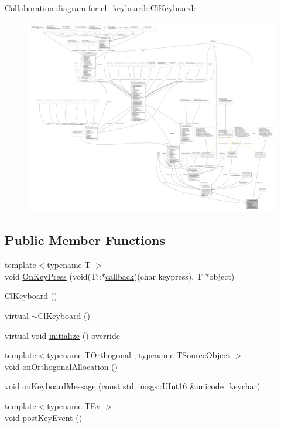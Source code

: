 Collaboration diagram for cl\+\_\+keyboard\+:\+:Cl\+Keyboard\+:
\nopagebreak
\begin{figure}[H]
\begin{center}
\leavevmode
\includegraphics[width=350pt]{classcl__keyboard_1_1ClKeyboard__coll__graph}
\end{center}
\end{figure}
\subsection*{Public Member Functions}
\begin{DoxyCompactItemize}
\item 
{\footnotesize template$<$typename T $>$ }\\void \hyperlink{classcl__keyboard_1_1ClKeyboard_ae9f4a6dc1ce18397394a432826970baa}{On\+Key\+Press} (void(T\+::$\ast$\hyperlink{sm__ridgeback__barrel__search__2_2servers_2opencv__perception__node_2opencv__perception__node_8cpp_a050e697bd654facce10ea3f6549669b3}{callback})(char keypress), T $\ast$object)
\item 
\hyperlink{classcl__keyboard_1_1ClKeyboard_aadf021c18ad32c50bd8b02f62293a47e}{Cl\+Keyboard} ()
\item 
virtual \hyperlink{classcl__keyboard_1_1ClKeyboard_af2f4ffb66639acb158d57d627a56d8e8}{$\sim$\+Cl\+Keyboard} ()
\item 
virtual void \hyperlink{classcl__keyboard_1_1ClKeyboard_af7f7fd9871ef5fcca400cd59d7b60775}{initialize} () override
\item 
{\footnotesize template$<$typename T\+Orthogonal , typename T\+Source\+Object $>$ }\\void \hyperlink{classcl__keyboard_1_1ClKeyboard_a9eed69eeb6e9d2ae0e166ccebad1557e}{on\+Orthogonal\+Allocation} ()
\item 
void \hyperlink{classcl__keyboard_1_1ClKeyboard_aff50ebe6b1b4aad0ea5b933ab0f00ef4}{on\+Keyboard\+Message} (const std\+\_\+msgs\+::\+U\+Int16 \&unicode\+\_\+keychar)
\item 
{\footnotesize template$<$typename T\+Ev $>$ }\\void \hyperlink{classcl__keyboard_1_1ClKeyboard_ac1311ce9a6a64e590df2e1b088f0e733}{post\+Key\+Event} ()
\end{DoxyCompactItemize}
